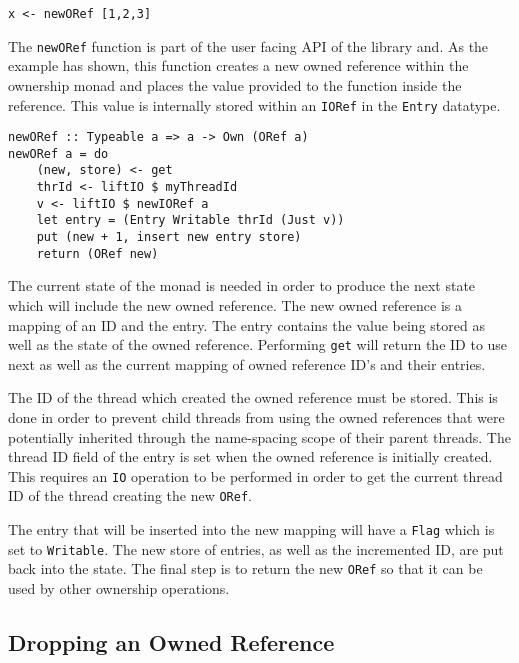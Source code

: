 \documentclass[onehalf,11pt]{beavtex}
\begin{document}
\begin{verbatim}
x <- newORef [1,2,3]
\end{verbatim}

The \texttt{newORef} function is part of the user facing API of the library
and. As the example has shown, this function creates a new owned reference
within the ownership monad and places the value provided to the function
inside the reference. This value is internally stored within an \texttt{IORef}
in the \texttt{Entry} datatype.

\begin{verbatim}
newORef :: Typeable a => a -> Own (ORef a)
newORef a = do
    (new, store) <- get
    thrId <- liftIO $ myThreadId
    v <- liftIO $ newIORef a
    let entry = (Entry Writable thrId (Just v))
    put (new + 1, insert new entry store)
    return (ORef new)
\end{verbatim}

The current state of the monad is needed in order to produce the next state
which will include the new owned reference.
The new owned reference is a mapping of an ID and the entry. The entry
contains the value being stored as well as the state of the owned reference.
Performing \texttt{get} will return the ID to use next as well as the current
mapping of owned reference ID's and their entries.

The ID of the thread which created the owned reference must be stored.
This is done in order to prevent child threads from using the owned
references that were potentially inherited through the name-spacing scope of
their parent threads.  The thread ID field of the entry is set when the owned
reference is initially created. This requires an \texttt{IO} operation to be
performed in order to get the current thread ID of the thread creating the
new \texttt{ORef}.

The entry that will be inserted into the new mapping will have a \texttt{Flag}
which is set to \texttt{Writable}.
The new store of entries, as well as the incremented ID, are put back into the
state.
The final step is to return the new \texttt{ORef} so that it can be used by other
ownership operations.

\subsection{Dropping an Owned Reference}
\end{document}
